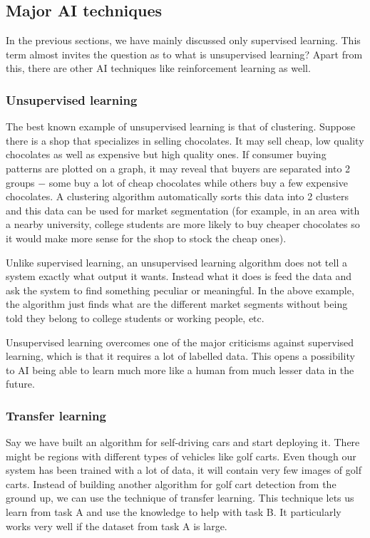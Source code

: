 \documentclass{article}[a4paper,12pt]
\theoremstyle{definition}
\begin{document}
\subsection{Major AI techniques}
In the previous sections, we have mainly discussed only supervised learning. This term almost invites the question as to what is unsupervised learning? Apart from this, there are other AI techniques like reinforcement learning as well.
\subsubsection{Unsupervised learning}
The best known example of unsupervised learning is that of clustering. Suppose there is a shop that specializes in selling chocolates. It may sell cheap, low quality chocolates as well as expensive but high quality ones. If consumer buying patterns are plotted on a graph, it may reveal that buyers are separated into 2 groups $-$ some buy a lot of cheap chocolates while others buy a few expensive chocolates. A clustering algorithm automatically sorts this data into 2 clusters and this data can be used for market segmentation (for example, in an area with a nearby university, college students are more likely to buy cheaper chocolates so it would make more sense for the shop to stock the cheap ones). 
\vspace{6pt}

Unlike supervised learning, an unsupervised learning algorithm does not tell a system exactly what output  it wants. Instead what it does is feed the data and ask the system to find something peculiar or meaningful. In the above example, the algorithm just finds what are the different market segments without being told they belong to college students or working people, etc.
\vspace{6pt}

Unsupervised learning overcomes one of the major criticisms against supervised learning, which is that it requires a lot of labelled data. This opens a possibility to AI being able to learn much more like a human from much lesser data in the future.
\subsubsection{Transfer learning}
Say we have built an algorithm for self-driving cars and start deploying it. There might be regions with different types of vehicles like golf carts. Even though our system has been trained with a lot of data, it will contain very few images of golf carts. Instead of building another algorithm for golf cart detection from the ground up, we can use the technique of transfer learning. This technique lets us learn from task A and use the knowledge to help with task B. It particularly works very well if the dataset from task A is large.
\end{document}
